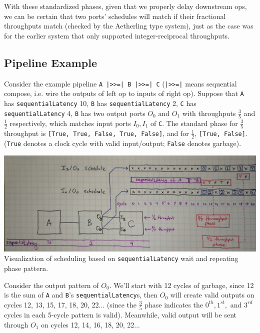 \documentclass[12pt]{article}
\begin{document}
With these standardized phases, given that we properly delay
downstream ops, we can be certain that two ports' schedules will match
if their fractional throughputs match (checked by the Aetherling type
system), just as the case was for the earlier system that only
supported integer-reciprocal throughputs.

\subsection{Pipeline Example}

Consider the example pipeline \texttt{A |>>=| B |>>=| C}
(\texttt{|>>=|} means sequential compose, i.e. wire the outputs of
left op to inputs of right op). Suppose that \texttt{A} has
\texttt{sequentialLatency} 10, \texttt{B} has \texttt{sequentialLatency}
2, \texttt{C} has \texttt{sequentialLatency} 4, \texttt{B} has two output
ports $O_0$ and $O_1$ with throughputs $\frac{3}{5}$ and $\frac{1}{2}$
respectively, which matches input ports $I_0, I_1$ of \texttt{C}.
The standard phase for $\frac{3}{5}$ throughput is
\texttt{[True, True, False, True, False]},
and for $\frac{1}{2}$, \texttt{[True, False]}. (\texttt{True} denotes
a clock cycle with valid input/output; \texttt{False} denotes garbage).

\begin{center}
\includegraphics[width=1.0\linewidth]{Figures/phase.jpg}
Visualization of scheduling based on \texttt{sequentialLatency}
wait and repeating phase pattern.
\end{center}

Consider the output pattern of $O_0$. We'll start with 12 cycles of
garbage, since 12 is the sum of \texttt{A} and \texttt{B}'s
\texttt{sequentialLatency}s, then $O_0$ will create valid outputs on
cycles 12, 13, 15, 17, 18, 20, 22... (since the $\frac{3}{5}$ phase
indicates the $0^{th}, 1^{st},$ and $3^{rd}$ cycles in each 5-cycle
pattern is valid). Meanwhile, valid output will be sent through $O_1$
on cycles 12, 14, 16, 18, 20, 22...
\end{document}
